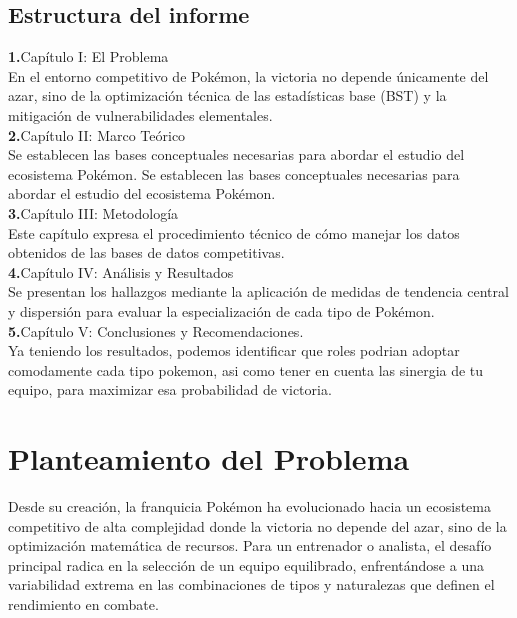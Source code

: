\documentclass[oneside,11pt]{Latex/Classes/PhDthesisPSnPDF}
\begin{document}
\section{Estructura del informe}

\textbf{1.}Capítulo I: El Problema\\

En el entorno competitivo de Pokémon, la victoria no depende únicamente
del azar, sino de la optimización técnica de las estadísticas base (BST)
y la mitigación de vulnerabilidades elementales.\\

\textbf{2.}Capítulo II: Marco Teórico\\

Se establecen las bases conceptuales necesarias para abordar el estudio
del ecosistema Pokémon. Se establecen las bases conceptuales necesarias
para abordar el estudio del ecosistema Pokémon.\\

\textbf{3.}Capítulo III: Metodología\\

Este capítulo expresa el procedimiento técnico de cómo manejar los datos
obtenidos de las bases de datos competitivas.\\

\textbf{4.}Capítulo IV: Análisis y Resultados\\

Se presentan los hallazgos mediante la aplicación de medidas de
tendencia central y dispersión para evaluar la especialización de cada
tipo de Pokémon.\\

\textbf{5.}Capítulo V: Conclusiones y Recomendaciones.\\

Ya teniendo los resultados, podemos identificar que roles podrian
adoptar comodamente cada tipo pokemon, asi como tener en cuenta las
sinergia de tu equipo, para maximizar esa probabilidad de victoria.\\

\chapter{Planteamiento del Problema}

Desde su creación, la franquicia Pokémon ha evolucionado hacia un
ecosistema competitivo de alta complejidad donde la victoria no depende
del azar, sino de la optimización matemática de recursos. Para un
entrenador o analista, el desafío principal radica en la selección de un
equipo equilibrado, enfrentándose a una variabilidad extrema en las
combinaciones de tipos y naturalezas que definen el rendimiento en
combate.
\end{document}
